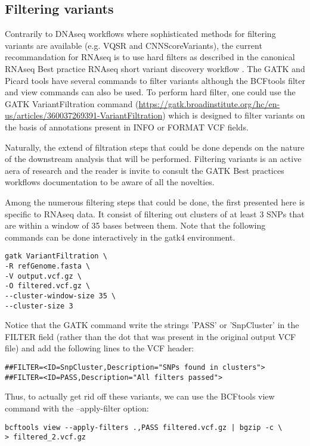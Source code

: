 \subsection{Filtering variants}

Contrarily to DNAseq workflows where sophisticated methods for filtering variants are available (e.g. VQSR and CNNScoreVariants), the current recommandation for RNAseq is to use hard filters as described in the canonical RNAseq Best practice RNAseq short variant discovery workflow \cite{GATK_RNAseq_variant_discovery}. The GATK and Picard tools have several commands to filter variants although the BCFtools filter and view commands can also be used. To perform hard filter, one could use the GATK VariantFiltration command  (\href{https://gatk.broadinstitute.org/hc/en-us/articles/360037269391-VariantFiltration}{https://gatk.broadinstitute.org/hc/en-us/articles/360037269391-VariantFiltration}) which is designed to filter variants on the basis of annotations present in INFO or FORMAT VCF fields.

Naturally, the extend of filtration steps that could be done depends on the nature of the downstream analysis that will be performed. Filtering variants is an active aera of research and the reader is invite to consult the GATK Best practices workflows documentation to be aware of all the novelties.

Among the numerous filtering steps that could be done, the first presented here is specific to RNAseq data. It consist of filtering out clusters of at least 3 SNPs that are within a window of 35 bases between them. Note that the following commands can be done interactively in the gatk4 environment. 


\begin{verbatim}
gatk VariantFiltration \
-R refGenome.fasta \
-V output.vcf.gz \
-O filtered.vcf.gz \
--cluster-window-size 35 \
--cluster-size 3
\end{verbatim}

Notice that the GATK command write the strings 'PASS' or 'SnpCluster' in the FILTER field (rather than the dot that was present in the original output VCF file) and add the following lines to the VCF header:

\begin{verbatim}
##FILTER=<ID=SnpCluster,Description="SNPs found in clusters">
##FILTER=<ID=PASS,Description="All filters passed">
\end{verbatim}


Thus, to actually get rid off these variants, we can use the BCFtools view command with the --apply-filter option:
\begin{verbatim}
bcftools view --apply-filters .,PASS filtered.vcf.gz | bgzip -c \
> filtered_2.vcf.gz
\end{verbatim}


